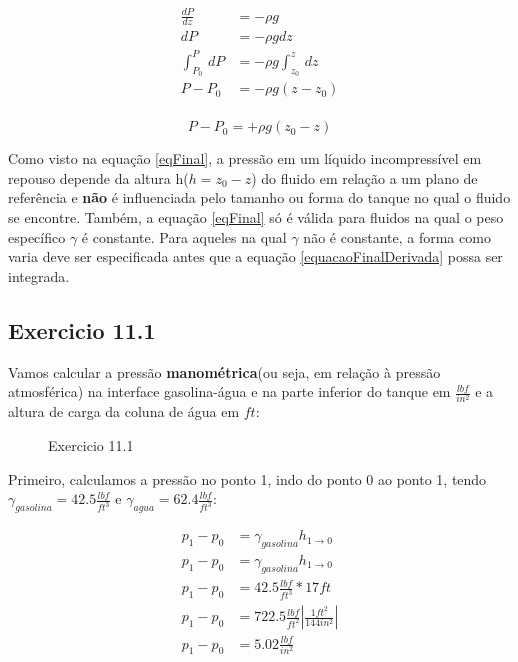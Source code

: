 \documentclass{article}
\begin{document}
\begin{align*}
\frac{dP}{dz} &=-\rho g \\
dP &= -\rho g dz\\
\int_{P_0}^{P} \,dP &= -\rho g \int_{z_0}^{z}\,dz \\
P-P_0 &= -\rho g (z-z_0) \\
\end{align*}

\begin{equation}
\boxed{P-P_0 = +\rho g (z_0-z)}     
\label{eqFinal}
\end{equation}

Como visto na equação \ref{eqFinal}, a pressão em um líquido incompressível em repouso depende da altura h($h=z_0-z$) do fluido em relação a um plano de referência e \textbf{não} é influenciada pelo tamanho ou forma do tanque no qual o fluido se encontre. Também, a equação \ref{eqFinal} só é válida para fluidos na qual o peso específico $\gamma$ é constante. Para aqueles na qual $\gamma$ não é constante, a forma como varia deve ser especificada antes que a equação \ref{equacaoFinalDerivada} possa ser integrada.



\subsection{Exercicio 11.1}
Vamos calcular a pressão \textbf{manométrica}(ou seja, em relação à pressão atmosférica) na interface gasolina-água e na parte inferior do tanque em $\frac{lbf}{in^2}$ e a altura de carga da coluna de água em $ft$:
\begin{figure}[!h]
     \centering
     \def\svgwidth{0.5\textwidth}
     
     \caption{\label{fig:exercicio11_1} Exercicio 11.1}
     \hfill
\end{figure}
Primeiro, calculamos a pressão no ponto 1, indo do ponto 0 ao ponto 1, tendo $\gamma_{gasolina}=42.5 \frac{lbf}{ft^3}$ e $\gamma_{agua}=62.4 \frac{lbf}{ft^3}$:

\begin{align*}
p_1 - p_0 &= \gamma_{gasolina}h_{1\rightarrow0}\\     
p_1 - p_0 &= \gamma_{gasolina}h_{1\rightarrow0}\\
p_1 - p_0 &= 42.5 \frac{lbf}{ft^3} * 17ft \\ 
p_1 - p_0 &= 722.5 \frac{lbf}{ft^2} \left|\frac{1ft^2}{144 in^2} \right| \\
p_1 - p_0 &= 5.02 \frac{lbf}{in^2}\\
\end{align*}
\end{document}
